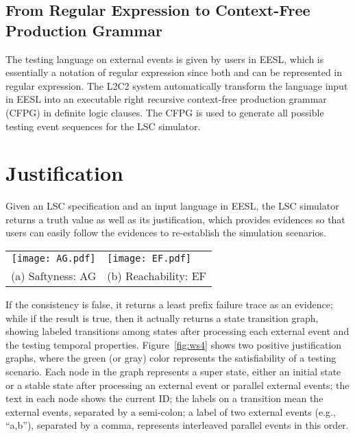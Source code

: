 \documentclass[]{llncs}
\begin{document}
\subsection{From Regular Expression to Context-Free Production Grammar}

The testing language on external events is
given by users in EESL, which is essentially a notation of
regular expression since both  and 
can be represented in regular expression.
The L2C2 system automatically transform the language input in EESL
into an executable right recursive context-free production grammar (CFPG)
in definite logic clauses.
The CFPG is used to generate all possible testing event sequences for
the LSC simulator.

\section{Justification}
\label{sec:justification}

Given an LSC specification and an input language in EESL,
the LSC simulator returns a truth value as well as its justification, which provides evidences
so that users can easily follow the
evidences to re-establish the simulation scenarios.

\begin{figure*}[!ht]
	\centering
	\begin{tabular}{cl}
		\texttt{[image: AG.pdf]}
		&
		\texttt{[image: EF.pdf]} \\
	  (a) Saftyness: AG
	  &
	  (b) Reachability: EF
	\end{tabular}
\caption{ID predicate specification}
\label{fig:ws4}
\end{figure*}

If the consistency is false, it returns a least prefix failure trace
as an evidence; while if the result is true, then
it actually returns a state transition graph, showing labeled transitions
among states after processing each external event and the testing temporal properties.
Figure~\ref{fig:ws4} shows two positive justification graphs,
where the green (or gray) color represents the satisfiability of a testing
scenario. Each node in the graph represents a super state, either an initial state or
a stable state after processing an external event or parallel external events;
the text in each node shows the current ID; the labels on a transition
mean the external events, separated by a semi-colon; a label of two external
events (e.g., ``a,b''), separated by a comma, represents interleaved parallel
events in this order.
\end{document}
